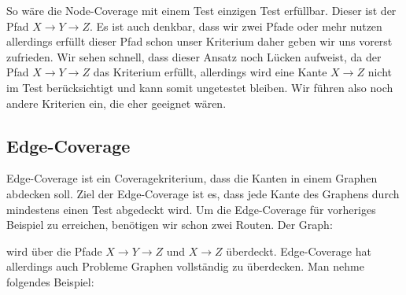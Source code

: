 
So wäre die Node-Coverage mit einem Test einzigen Test erfüllbar.
Dieser ist der Pfad $X \rightarrow Y \rightarrow Z$.
Es ist auch denkbar, dass wir zwei Pfade oder mehr nutzen allerdings erfüllt dieser Pfad schon unser Kriterium daher geben wir uns vorerst zufrieden.
Wir sehen schnell, dass dieser Ansatz noch Lücken aufweist, da der Pfad $X \rightarrow Y \rightarrow Z$ das Kriterium erfüllt, allerdings wird eine Kante $X \rightarrow Z$ nicht im
Test berücksichtigt und kann somit ungetestet bleiben.
Wir führen also noch andere Kriterien ein, die eher geeignet wären.

\subsection{Edge-Coverage}

Edge-Coverage ist ein Coveragekriterium, dass die Kanten in einem Graphen abdecken soll.
Ziel der Edge-Coverage ist es, dass jede Kante des Graphens durch mindestens einen Test abgedeckt wird.
Um die Edge-Coverage für vorheriges Beispiel zu erreichen, benötigen wir schon zwei Routen.
Der Graph:


wird über die Pfade $X \rightarrow Y \rightarrow Z$ und $X \rightarrow Z$ überdeckt.
Edge-Coverage hat allerdings auch Probleme Graphen vollständig zu überdecken.
Man nehme folgendes Beispiel:


